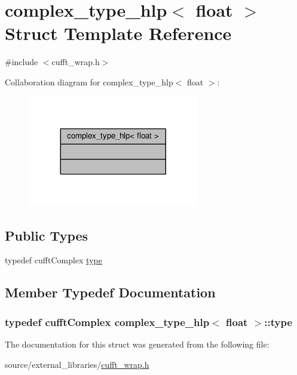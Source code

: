 \hypertarget{structcomplex__type__hlp_3_01float_01_4}{\section{complex\-\_\-type\-\_\-hlp$<$ float $>$ Struct Template Reference}
\label{structcomplex__type__hlp_3_01float_01_4}
}


{\ttfamily \#include $<$cufft\-\_\-wrap.\-h$>$}



Collaboration diagram for complex\-\_\-type\-\_\-hlp$<$ float $>$\-:
\nopagebreak
\begin{figure}[H]
\begin{center}
\leavevmode
\includegraphics[width=212pt]{structcomplex__type__hlp_3_01float_01_4__coll__graph}
\end{center}
\end{figure}
\subsection*{Public Types}
\begin{DoxyCompactItemize}
\item 
typedef cufft\-Complex \hyperlink{structcomplex__type__hlp_3_01float_01_4_ae0cfcbdeb31ff876914355874c131ceb}{type}
\end{DoxyCompactItemize}


\subsection{Member Typedef Documentation}
\hypertarget{structcomplex__type__hlp_3_01float_01_4_ae0cfcbdeb31ff876914355874c131ceb}{
\subsubsection[{type}]{\setlength{\rightskip}{0pt plus 5cm}typedef cufft\-Complex {\bf complex\-\_\-type\-\_\-hlp}$<$ float $>$\-::{\bf type}}}\label{structcomplex__type__hlp_3_01float_01_4_ae0cfcbdeb31ff876914355874c131ceb}


The documentation for this struct was generated from the following file\-:\begin{DoxyCompactItemize}
\item 
source/external\-\_\-libraries/\hyperlink{cufft__wrap_8h}{cufft\-\_\-wrap.\-h}\end{DoxyCompactItemize}
